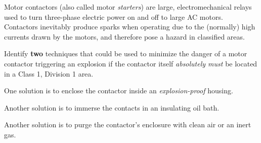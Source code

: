 

Motor contactors (also called motor {\it starters}) are large, electromechanical relays used to turn three-phase electric power on and off to large AC motors.  Contactors inevitably produce sparks when operating due to the (normally) high currents drawn by the motors, and therefore pose a hazard in classified areas.

Identify {\bf two} techniques that could be used to minimize the danger of a motor contactor triggering an explosion if the contactor itself {\it absolutely must} be located in a Class 1, Division 1 area.







One solution is to enclose the contactor inside an {\it explosion-proof} housing.

\vskip 10pt

Another solution is to immerse the contacts in an insulating oil bath.

\vskip 10pt

Another solution is to purge the contactor's enclosure with clean air or an inert gas.











